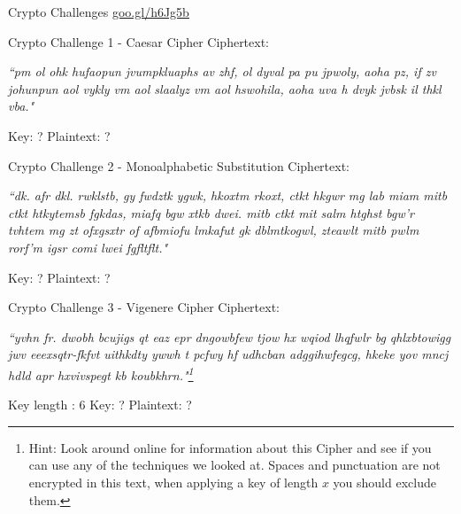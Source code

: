 \documentclass{beamer}
\begin{document}
\begin{frame}{Crypto Challenges}
\url{goo.gl/h6Jg5b}
\end{frame}

\begin{frame}{Crypto Challenge 1 - Caesar Cipher}
Ciphertext: {\small \textit{``pm ol ohk hufaopun jvumpkluaphs av zhf, ol dyval pa pu jpwoly, aoha pz, if zv johunpun aol vykly vm aol slaalyz vm aol hswohila, aoha uva h dvyk jvbsk il thkl vba."} \par} 
Key: ? \newline
Plaintext: ? 
\end{frame}

\begin{frame}{Crypto Challenge 2 - Monoalphabetic Substitution}
Ciphertext: {\small \textit{``dk. afr dkl. rwklstb, gy fwdztk ygwk, hkoxtm rkoxt, ctkt hkgwr mg lab miam mitb ctkt htkytemsb fgkdas, miafq bgw xtkb dwei. mitb ctkt mit salm htghst bgw’r tvhtem mg zt ofxgsxtr of afbmiofu lmkafut gk dblmtkogwl, zteawlt mitb pwlm rorf’m igsr comi lwei fgfltflt."} \par} 
Key: ? \newline
Plaintext: ? 
\end{frame}

\begin{frame}{Crypto Challenge 3 - Vigenere Cipher }
Ciphertext: {\small \textit{``yvhn fr. dwobh bcujigs qt eaz epr dngowbfew tjow hx wqiod lhqfwlr bg qhlxbtowigg jwv eeexsqtr-fkfvt uithkdty ywwh t pcfwy hf udhcban adggihwfegcg, hkeke yov mncj hdld apr hxvivspegt kb koubkhrn."\footnote{Hint: Look around online for information about this Cipher and see if you can use any of the techniques we looked at. Spaces and punctuation are not encrypted in this text, when applying a key of length \(x\) you should exclude them.}} \par}
Key length : 6\newline
Key: ? \newline
Plaintext: ? \newline
\end{frame}

\backcover
\end{document}
